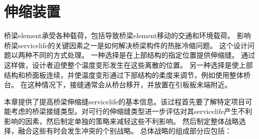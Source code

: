\chapter{伸缩装置}\label{chp:expansion-devices}
桥梁\gls*{element}承受各种载荷，包括导致桥梁\gls*{element}移动的交通和环境载荷。 影响桥梁\gls*{servicelife}的关键因素之一是如何解决桥梁构件的热胀冷缩问题。 这个设计问题以两种不同的方式处理。 一种选择是在上部结构的指定位置提供伸缩缝。 通过这样做，设计者迫使整个温度变形发生在这些离散的位置。 另一种选择是使上部结构和桥面板连续，并使温度变形通过下部结构的柔度来调节，例如使用整体桥台。 在这种情况下，接缝通常会从桥台移开，并放置在引板板末端附近。

本章提供了提高桥梁伸缩缝\gls*{servicelife}的基本信息。该过程首先要了解特定项目可能考虑的桥梁接缝类型。对可行的伸缩缝类型进一步评估对其\gls*{servicelife}产生不利影响的因素，然后制定单独的策略来减轻这些不利影响。 然后制定整体战略选择，融合这些有时会发生冲突的个别战略。 总体战略的组成部分应包括：

